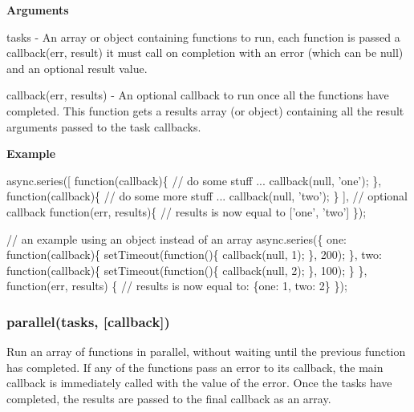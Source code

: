 {\bfseries Arguments}


\begin{DoxyItemize}
\item tasks -\/ An array or object containing functions to run, each function is passed a callback(err, result) it must call on completion with an error (which can be null) and an optional result value.
\item callback(err, results) -\/ An optional callback to run once all the functions have completed. This function gets a results array (or object) containing all the result arguments passed to the task callbacks.
\end{DoxyItemize}

{\bfseries Example}


\begin{DoxyCode}
async.series([
    \textcolor{keyword}{function}(callback)\{
        \textcolor{comment}{// do some stuff ...}
        callback(null, \textcolor{stringliteral}{'one'});
    \},
    \textcolor{keyword}{function}(callback)\{
        \textcolor{comment}{// do some more stuff ...}
        callback(null, \textcolor{stringliteral}{'two'});
    \}
],
\textcolor{comment}{// optional callback}
\textcolor{keyword}{function}(err, results)\{
    \textcolor{comment}{// results is now equal to ['one', 'two']}
\});


\textcolor{comment}{// an example using an object instead of an array}
async.series(\{
    one: \textcolor{keyword}{function}(callback)\{
        setTimeout(\textcolor{keyword}{function}()\{
            callback(null, 1);
        \}, 200);
    \},
    two: \textcolor{keyword}{function}(callback)\{
        setTimeout(\textcolor{keyword}{function}()\{
            callback(null, 2);
        \}, 100);
    \}
\},
\textcolor{keyword}{function}(err, results) \{
    \textcolor{comment}{// results is now equal to: \{one: 1, two: 2\}}
\});
\end{DoxyCode}
 



\label{_parallel}%
 \subsubsection*{parallel(tasks, \mbox{[}callback\mbox{]})}

Run an array of functions in parallel, without waiting until the previous function has completed. If any of the functions pass an error to its callback, the main callback is immediately called with the value of the error. Once the tasks have completed, the results are passed to the final callback as an array.

